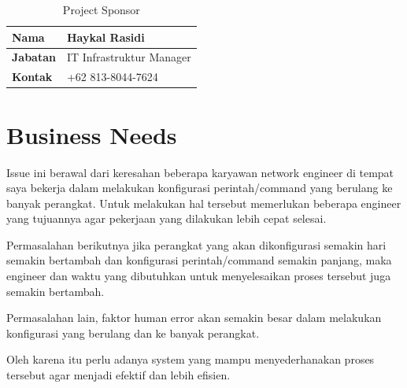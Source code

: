 \begin{table}[h!]
    \centering
    \caption{Project Sponsor}
    \begin{tabular}{|l|l|}
        \hline
        \textbf{Nama} & Haykal Rasidi \\ \hline
        \textbf{Jabatan} & IT Infrastruktur Manager \\ \hline
        \textbf{Kontak} & +62 813-8044-7624 \\ \hline
    \end{tabular}
\end{table}

\section{Business Needs}

Issue ini berawal dari keresahan beberapa karyawan network engineer di tempat saya bekerja dalam melakukan konfigurasi perintah/command yang berulang ke banyak perangkat. Untuk melakukan hal tersebut memerlukan beberapa engineer yang tujuannya agar pekerjaan yang dilakukan lebih cepat selesai. 

Permasalahan berikutnya jika perangkat yang akan dikonfigurasi semakin hari semakin bertambah dan konfigurasi perintah/command semakin panjang, maka engineer dan waktu yang dibutuhkan untuk menyelesaikan proses tersebut juga semakin bertambah.  

Permasalahan lain, faktor human error akan semakin besar dalam melakukan konfigurasi yang berulang dan ke banyak perangkat. 

Oleh karena itu perlu adanya system yang mampu menyederhanakan proses tersebut agar menjadi efektif dan lebih efisien. 


\newpage 

